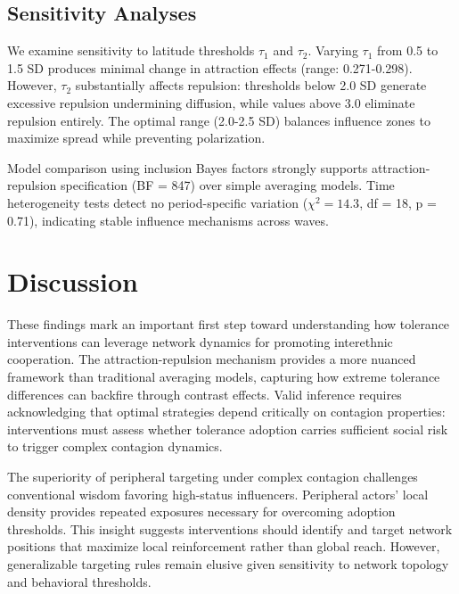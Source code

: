 \documentclass[12pt,a4paper]{article}
\begin{document}
\subsection{Sensitivity Analyses}

We examine sensitivity to latitude thresholds $\tau_1$ and $\tau_2$. Varying $\tau_1$ from 0.5 to 1.5 SD produces minimal change in attraction effects (range: 0.271-0.298). However, $\tau_2$ substantially affects repulsion: thresholds below 2.0 SD generate excessive repulsion undermining diffusion, while values above 3.0 eliminate repulsion entirely. The optimal range (2.0-2.5 SD) balances influence zones to maximize spread while preventing polarization.

Model comparison using inclusion Bayes factors strongly supports attraction-repulsion specification (BF = 847) over simple averaging models. Time heterogeneity tests detect no period-specific variation ($\chi^2 = 14.3$, df = 18, p = 0.71), indicating stable influence mechanisms across waves.


\section{Discussion}

These findings mark an important first step toward understanding how tolerance interventions can leverage network dynamics for promoting interethnic cooperation. The attraction-repulsion mechanism provides a more nuanced framework than traditional averaging models, capturing how extreme tolerance differences can backfire through contrast effects. Valid inference requires acknowledging that optimal strategies depend critically on contagion properties: interventions must assess whether tolerance adoption carries sufficient social risk to trigger complex contagion dynamics.

The superiority of peripheral targeting under complex contagion challenges conventional wisdom favoring high-status influencers. Peripheral actors' local density provides repeated exposures necessary for overcoming adoption thresholds. This insight suggests interventions should identify and target network positions that maximize local reinforcement rather than global reach. However, generalizable targeting rules remain elusive given sensitivity to network topology and behavioral thresholds.
\end{document}
